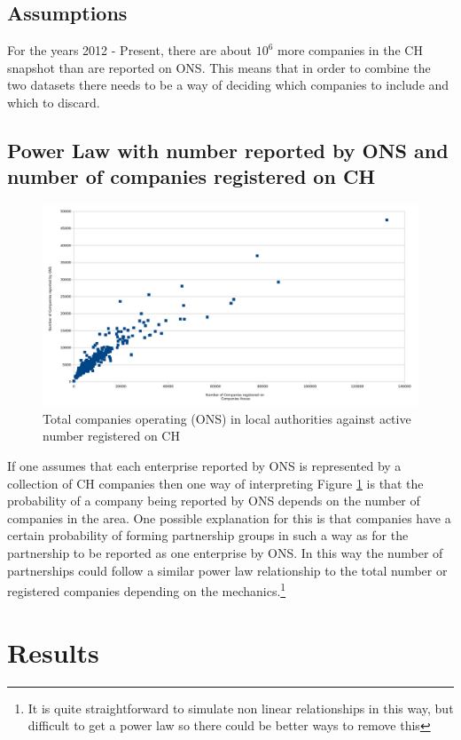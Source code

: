 \documentclass[a4paper,10pt]{article}
\begin{document}
\subsection{Assumptions}


For the years 2012 - Present, there are about $10^6$ more companies in the CH snapshot than are reported on ONS. This means that in order to combine the two datasets there needs to be a way of deciding which companies to include and which to discard.
\subsection{Power Law with number reported by ONS and number of companies registered on CH}
\begin{figure}[ht]
\includegraphics[width=\textwidth]{graphics/2017_ons_against_ch}
\caption{Total companies operating (ONS) in local authorities against active number registered on CH}
\label{ONS against CH}
\end{figure}
If one assumes that each enterprise reported by ONS is represented by a collection of CH companies then one way of interpreting Figure \ref{ONS against CH} is that the probability of a company being reported by ONS depends on the number of companies in the area. One possible explanation for this is that companies have a certain probability of forming partnership groups in such a way as for the partnership to be reported as one enterprise by ONS. In this way the number of partnerships could follow a similar power law relationship to the total number or registered companies depending on the mechanics.\footnote{It is quite straightforward to simulate non linear relationships in this way, but difficult to get a power law so there could be better ways to remove this}

\section{Results}
\end{document}
